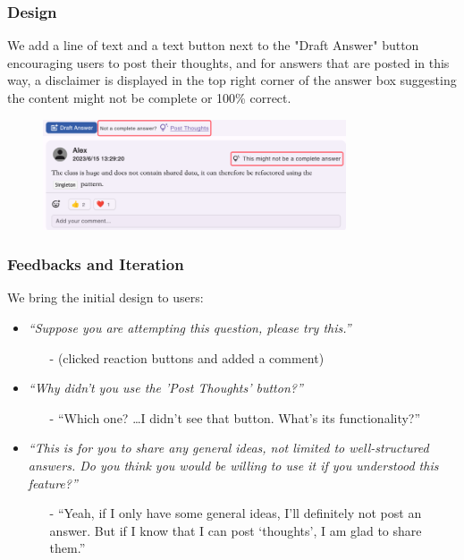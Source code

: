 \documentclass[a4paper]{article}
\begin{document}
    \subsubsection*{Design}
    We add a line of text and a text button next to the "Draft Answer" button encouraging users to post their thoughts,
    and for answers that are posted in this way, a disclaimer is displayed in the top right corner of the answer box
    suggesting the content might not be complete or 100\% correct.

    \begin{figure}[H]
        \centering
        \includegraphics[width=0.8\textwidth]{thought1}
    \end{figure}

    \subsubsection*{Feedbacks and Iteration}
    \noindent We bring the initial design to users:

    \begin{itemize}
        \item \textit{``Suppose you are attempting this question, please try this.''}
        \begin{itemize}
            \item[-] (clicked reaction buttons and added a comment)
        \end{itemize}

        \item \textit{``Why didn't you use the 'Post Thoughts' button?''}
        \begin{itemize}
            \item[-] ``Which one? \ldots I didn't see that button.
            What's its functionality?''
        \end{itemize}

        \item
        \textit{``This is for you to share any general ideas, not limited to well-structured answers.
        Do you think you would be willing to use it if you understood this feature?''}
        \begin{itemize}
            \item[-] ``Yeah, if I only have some general ideas, I'll definitely not post an answer.
            But if I know that I can post `thoughts', I am glad to share them.''
        \end{itemize}
    \end{itemize}
\end{document}
